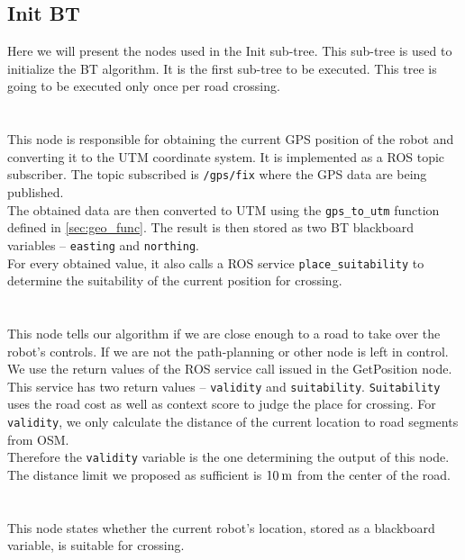 \subsection{Init BT}
\label{sec:Init-BT-impl}
    Here we will present the nodes used in the Init sub-tree. This sub-tree is used to initialize the BT algorithm. It is the first sub-tree to be executed. This tree is going to be executed only once per road crossing.\\\\
    \\
        This node is responsible for obtaining the current GPS position of the robot and converting it to the UTM coordinate system. It is implemented as a ROS topic subscriber. The topic subscribed is \texttt{/gps/fix} where the GPS data are being published.\\
        The obtained data are then converted to UTM using the \texttt{gps\_to\_utm} function defined in \ref{sec:geo_func}. The result is then stored as two BT blackboard variables -- \texttt{easting} and \texttt{northing}.\\
        For every obtained value, it also calls a ROS service \texttt{place\_suitability} to determine the suitability of the current position for crossing.\\\\
    \\
        This node tells our algorithm if we are close enough to a road to take over the robot's controls. If we are not the path-planning or other node is left in control.\\
        We use the return values of the ROS service call issued in the GetPosition node. This service has two return values -- \texttt{validity} and \texttt{suitability}. \texttt{Suitability} uses the road cost as well as context score to judge the place for crossing. For \texttt{validity}, we only calculate the distance of the current location to road segments from OSM.\\
        Therefore the \texttt{validity} variable is the one determining the output of this node. The distance limit we proposed as sufficient is $10\:\rm{m}$ from the center of the road.\\\\
    \\
        This node states whether the current robot's location, stored as a blackboard variable, is suitable for crossing.\\
